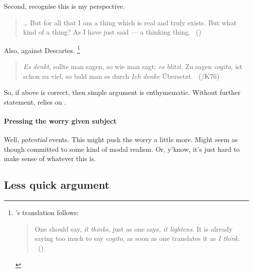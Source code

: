 \begin{note}
  Second, recognise this is my perspective.

  \cite{Descartes:1996vp}

  \begin{quote}
    \dots
    But for all that I am a thing which is real and truly exists.
    But what kind of a thing?
    As I have just said --- a thinking thing.%
    \mbox{ }\hfill\mbox{(\citeyear[18]{Descartes:1996vp})}
  \end{quote}

  Also, \citeauthor{Lichtenberg:1991tf} against Descartes.%
  \footnote{
    \citeauthor{Zoller:1992ud}'s translation follows:
    \begin{quote}
      One should say, \emph{it thinks}, just as one says, \emph{it lightens}.
      It is already saying too much to say \emph{cogito}, as soon as one translates it as \emph{I think}.
      \mbox{ }\hfill\mbox{(\citeyear[418]{Zoller:1992ud})}
    \end{quote}
  }
  \begin{quote}
    \emph{Es denkt}, sollte man sagen, so wie man sagt: \emph{es blitzt}.
    Zu sagen \emph{cogito}, ist schon zu viel, so bald man es durch \emph{Ich denke} \"{U}bersetzt.
    \mbox{ }\hfill\mbox{(\citeyear[412]{Lichtenberg:1991tf}/K76)}
  \end{quote}
\end{note}

\begin{note}
  So, if above is correct, then simple argument is enthymematic.
  Without further statement, relies on .
\end{note}

\paragraph{Pressing the worry given subject}

\begin{note}
  Well, \emph{potential} events.
  This might push the worry a little more.
  Might seem as though committed to some kind of modal realism.
  Or, y'know, it's just hard to make sense of whatever this is.
\end{note}

\subsection{Less quick argument}
\label{sec:less-quick-argument}

